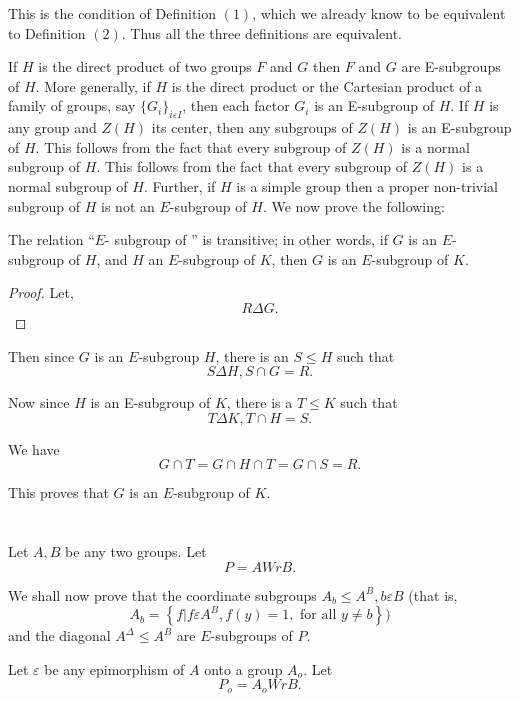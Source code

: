 This is the condition of Definition $(1)$, which we already know to be
equivalent to Definition $(2)$. Thus all the three definitions are
equivalent. 
 
If $H$ is the direct product of two groups $F$ and $G$ then $F$ and
$G$ are E-subgroups of $H$. More generally, if $H$ is the direct
product or the Cartesian product of a family of groups, say
$\{G_i\}_{i \varepsilon  I}$, then each factor $G_i$ is an E-subgroup
of $H$. If $H$ is any group and $Z(H)$ its center, then any subgroups
of $Z(H)$ is an E-subgroup of $H$. This follows from the fact that
every subgroup of $Z(H)$ is a normal subgroup of $H$. This follows
from the fact that every subgroup of $Z(H)$ is a normal subgroup of
$H$. Further,  if $H$ is a simple group then a proper non-trivial
subgroup of $H$ is not an $E$-subgroup of $H$. We now prove the
following: 
\begin{Theorem} %
  The relation ``$E$- subgroup of '' is transitive; in other words, if
  $G$ is an $E$-subgroup of $H$, and $H$ an $E$-subgroup of $K$, then
  $G$ is an $E$-subgroup of $K$. 
\end{Theorem} 

\begin{proof}
  Let,
  $$
  R \Delta G.
  $$
\end{proof}

 Then since $G$ is an $E$-subgroup $H$, there is an $S \le  H$ such that 
 $$
 S \Delta H, S \cap G =R.
 $$
 
 Now since $H$ is an E-subgroup of $K$, there is a $T \le  K$ such that
 $$
 T \Delta K, T \cap H=S.
 $$
 
 We have 
 $$
 G \cap T = G \cap H \cap T = G \cap S= R.
 $$
 
 This proves that $G$ is an $E$-subgroup of $K$.

 \section{} %
 
 Let $A,B$ be any two groups. Let 
 $$
 P= A W r B.
 $$
 
 We shall now prove that the coordinate subgroups $A_b \le A^B, b
 \varepsilon B$ (that is, 
 $$
 A_b = \left\{ f \bigg | f  \varepsilon A^B, f(y) =1,  \text{ for all
 } y \neq b \right\}) 
 $$
 and the diagonal $A^\Delta \le A^B$ are $E$-subgroups of $P$.
 
 Let $\varepsilon$ be any epimorphism of $A$ onto a group  $A_o$. Let 
 $$
 P_o = A_o W r B.
 $$
 
